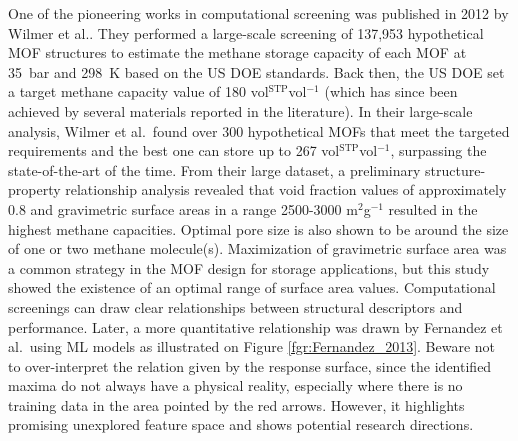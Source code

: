 \documentclass[main.tex]{subfiles}
\begin{document}
One of the pioneering works in computational screening was published in 2012 by Wilmer et al.\cite{Wilmer_2012}. They performed a large-scale screening of 137,953 hypothetical MOF structures to estimate the methane storage capacity of each MOF at \SI{35}{\bar} and \SI{298}{\kelvin} based on the US DOE standards. Back then, the US DOE set a target methane capacity value of 180 vol{\footnotesize$^\mathrm{STP}$}vol$^{-1}$ (which has since been achieved by several materials reported in the literature). In their large-scale analysis, Wilmer et al.\ found over 300 hypothetical MOFs that meet the targeted requirements and the best one can store up to 267 vol{\footnotesize$^\mathrm{STP}$}vol$^{-1}$, surpassing the state-of-the-art of the time. From their large dataset, a preliminary structure-property relationship analysis revealed that void fraction values of approximately 0.8 and gravimetric surface areas in a range 2500-3000 m$^2$g$^{-1}$ resulted in the highest methane capacities. Optimal pore size is also shown to be around the size of one or two methane molecule(s). Maximization of gravimetric surface area was a common strategy in the MOF design for storage applications, but this study showed the existence of an optimal range of surface area values. Computational screenings can draw clear relationships between structural descriptors and performance. Later, a more quantitative relationship was drawn by Fernandez et al.\ using ML models as illustrated on Figure \ref{fgr:Fernandez_2013}. Beware not to over-interpret the relation given by the response surface, since the identified maxima do not always have a physical reality, especially where there is no training data in the area pointed by the red arrows. However, it highlights promising unexplored feature space and shows potential research directions.
\end{document}
